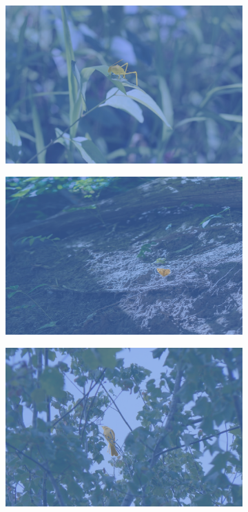 \documentclass[a4paper,12pt]{ctexart}
\begin{document}
\begin{figure}
    \centering
    \begin{subfigure}{0.32\textwidth}
        \centering
        \includegraphics[width=\linewidth]{figures/small_1_resized.png}
    \end{subfigure}%
    \hfill
    \begin{subfigure}{0.32\textwidth}
        \centering
        \includegraphics[width=\linewidth]{figures/small_2_resized.png}
    \end{subfigure}
    \hfill
    \begin{subfigure}{0.32\textwidth}
        \centering
        \includegraphics[width=\linewidth]{figures/small_3_resized.png}
    \end{subfigure}%


\end{figure}
\end{document}
